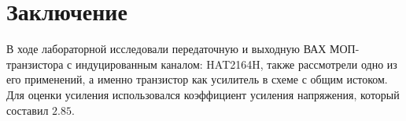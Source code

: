 \section*{Заключение}

В ходе лабораторной исследовали передаточную и выходную ВАХ МОП-транзистора с 
индуцированным каналом: HAT2164H, 
также рассмотрели одно из его применений, а именно транзистор как
усилитель в схеме с общим истоком. Для оценки усиления использовался коэффициент 
усиления напряжения, который составил $2.85$.
